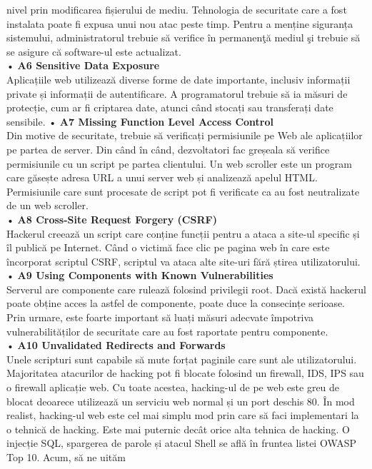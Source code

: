 \documentclass[oneside,20pt]{article}          %
\begin{document}
nivel prin modificarea fișierului de mediu. Tehnologia de securitate
care a fost instalata poate fi expusa unui nou atac peste
timp. Pentru a menține siguranța sistemului, 
administratorul trebuie să verifice în permanenţă mediul şi
trebuie să se asigure că software-ul este actualizat.\\
• \textbf{A6 Sensitive Data Exposure}\\
Aplicațiile web utilizează diverse forme de date importante,
inclusiv informații private și informații de autentificare. A
programatorul trebuie să ia măsuri de protecție, cum ar fi criptarea
date, atunci când stocați sau transferați date sensibile.
• \textbf{A7 Missing Function Level Access Control}\\
Din motive de securitate, trebuie să verificați permisiunile pe Web
ale aplicațiilor pe partea de server. Din când în când, dezvoltatori
fac greșeala să verifice permisiunile cu un script pe 
partea clientului. Un web scroller este un program care găsește adresa URL a unui
server web și analizează apelul HTML. Permisiunile care
sunt procesate de script pot fi verificate ca au fost
neutralizate de un web scroller.\\
• \textbf{A8 Cross-Site Request Forgery (CSRF)}\\
Hackerul creează un script care conține funcții pentru a ataca a
site-ul specific și îl publică pe Internet. Când o victimă
face clic pe pagina web în care este încorporat scriptul CSRF,
scriptul va ataca alte site-uri fără știrea utilizatorului.\\
• \textbf{A9 Using Components with Known Vulnerabilities}\\
Serverul are componente care rulează folosind privilegii root. Dacă există
hackerul poate obține acces la astfel de componente, poate duce la
consecințe serioase. Prin urmare, este foarte important să luați
măsuri adecvate împotriva vulnerabilităților de securitate care
au fost raportate pentru componente.\\
• \textbf{A10 Unvalidated Redirects and Forwards}\\
Unele scripturi sunt capabile să mute forțat paginile care sunt ale utilizatorului.
Majoritatea atacurilor de hacking pot fi blocate folosind un firewall, IDS, IPS sau o
firewall aplicație web. Cu toate acestea, hacking-ul de pe web este greu de blocat
deoarece utilizează un serviciu web normal și un port deschis 80.
În mod realist, hacking-ul web este cel mai simplu mod prin care să faci
implementari la o tehnică de hacking. Este mai puternic decât orice alta
tehnica de hacking. O injecție SQL, spargerea de parole și  atacul Shell se află în fruntea listei OWASP Top 10. Acum, să ne uităm
\end{document}
